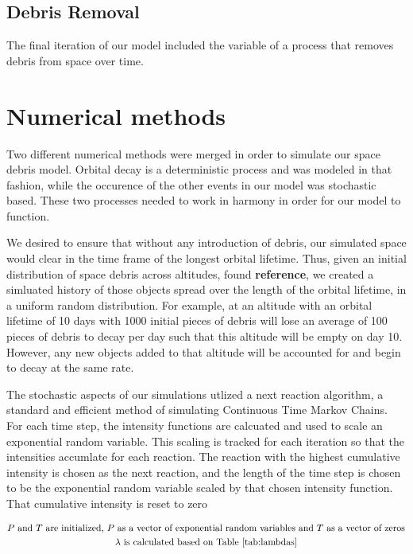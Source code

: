 \documentclass[pre,12pt]{revtex4-1}
\begin{document}
\subsection{Debris Removal}

The final iteration of our model included the variable of a process that removes debris from space over time. 


\section{Numerical methods}\label{Numerics}

Two different numerical methods were merged in order to simulate our space debris model. Orbital decay is a deterministic process and was modeled in that fashion, while the occurence of the other events in our model was stochastic based. These two processes needed to work in harmony in order for our model to function.

We desired to ensure that without any introduction of debris, our simulated space would clear in the time frame of the longest orbital lifetime. Thus, given an initial distribution of space debris across altitudes, found \textbf{reference}, we created a simluated history of those objects spread over the length of the orbital lifetime, in a uniform random distribution. For example, at an altitude with an orbital lifetime of 10 days with 1000 initial pieces of debris will lose an average of 100 pieces of debris to decay per day such that this altitude will be empty on day 10. However, any new objects added to that altitude will be accounted for and begin to decay at the same rate.

The stochastic aspects of our simulations utlized a next reaction algorithm, a standard and efficient method of simulating Continuous Time Markov Chains. For each time step, the intensity functions are calcuated and used to scale an exponential random variable. This scaling is tracked for each iteration so that the intensities accumlate for each reaction. The reaction with the highest cumulative intensity is chosen as the next reaction, and the length of the time step is chosen to be the exponential random variable scaled by that chosen intensity function. That cumulative intensity is reset to zero

\begin{equation*}
\begin{gathered}
	P \text{ and } T \text{ are initialized, $P$ as a vector of exponential random variables and $T$ as a vector of zeros}\\
	\lambda \text{ is calculated based on Table \ref{tab:lambdas}}\\
\end{gathered}
\end{equation*}
\end{document}

